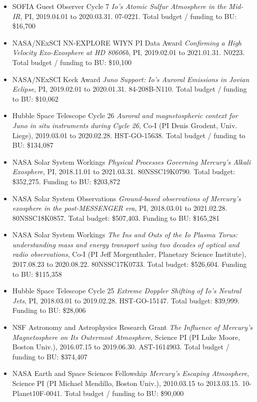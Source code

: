 \documentclass[12pt]{report}
\begin{document}
\begin{itemize}
 \item SOFIA Guest Observer Cycle 7 {\it Io's Atomic Sulfur Atmosphere in the Mid-IR}, PI, 2019.04.01 to 2020.03.31. 07-0221. Total budget / funding to BU: \$16,700
 \item NASA/NExSCI NN-EXPLORE WIYN PI Data Award {\it Confirming a High Velocity Exo-Exosphere at HD 80606b}, PI, 2019.02.01 to 2021.01.31. N0223. Total budget / funding to BU: \$10,100
 \item NASA/NExSCI Keck Award {\it Juno Support: Io's Auroral Emissions in Jovian Eclipse}, PI, 2019.02.01 to 2020.01.31. 84-208B-N110. Total budget / funding to BU: \$10,062
 \item Hubble Space Telescope Cycle 26 {\it Auroral and magnetospheric context for Juno in situ instruments during Cycle 26}, Co-I (PI Denis Grodent, Univ. Liege), 2019.03.01 to 2020.02.28. HST-GO-15638. Total budget / funding to BU: \$134,087
 \item NASA Solar System Workings  {\it Physical Processes Governing Mercury's Alkali Exosphere}, PI, 2018.11.01 to 2021.03.31. 80NSSC19K0790. Total budget: \$352,275. Funding to BU: \$203,872
 \item NASA Solar System Observations {\it Ground-based observations of Mercury's exosphere in the post-MESSENGER era}, PI, 2018.03.01 to 2021.02.28. 80NSSC18K0857. Total budget: \$507,403. Funding to BU: \$165,281
 \item NASA Solar System Workings {\it The Ins and Outs of the Io Plasma Torus: understanding mass and energy transport using two decades of optical and radio observations}, Co-I (PI Jeff Morgenthaler, Planetary Science Institute), 2017.08.23 to 2020.08.22. 80NSSC17K0733. Total budget: \$526,604. Funding to BU: \$115,358
 \item Hubble Space Telescope Cycle 25 {\it Extreme Doppler Shifting of Io's Neutral Jets}, PI, 2018.03.01 to 2019.02.28. HST-GO-15147. Total budget: \$39,999. Funding to BU: \$28,006
 \item NSF Astronomy and Astrophysics Research Grant {\it The Influence of Mercury's Magnetosphere on Its Outermost Atmosphere}, Science PI (PI Luke Moore, Boston Univ.), 2016.07.15 to 2019.06.30. AST-1614903. Total budget / funding to BU: \$374,407
 \item NASA Earth and Space Sciences Fellowship {\it Mercury's Escaping Atmosphere}, Science PI (PI Michael Mendillo, Boston Univ.), 2010.03.15 to 2013.03.15. 10-Planet10F-0041. Total budget / funding to BU: \$90,000 \label{totalgrants}
 \end{itemize}
\vspace{2 mm}
\end{document}

